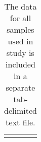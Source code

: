 \begin{table}[htbp]
\sffamily
\captionsetup{name=Table S, labelformat=noSpace}
\caption{
    The data for all samples used in study is included in a separate
    tab-delimited text file.
}
\centering
\begin{tabular}{ l l }
     &  \\
\end{tabular}
\label{table:reftosampledata}
\end{table}



